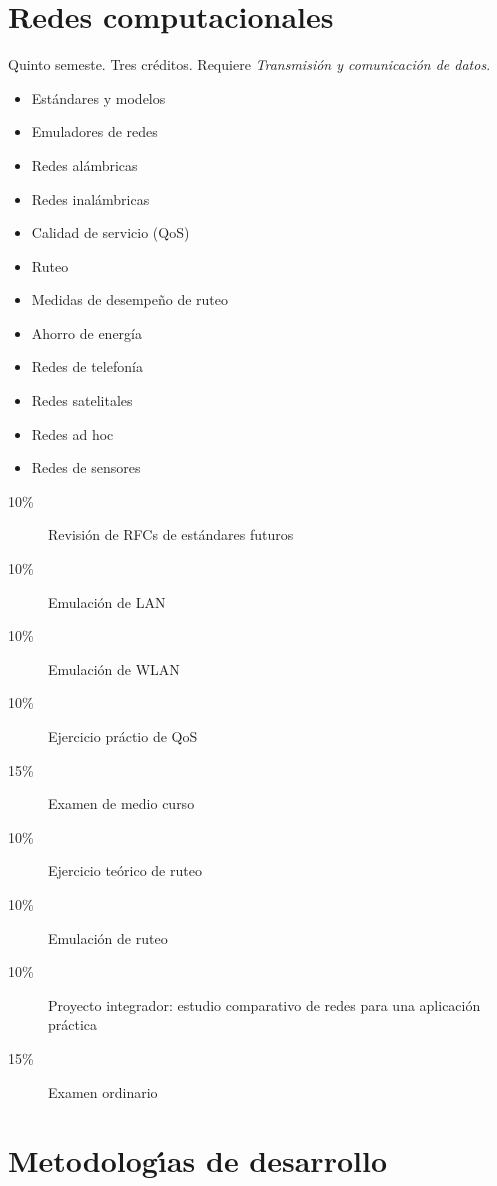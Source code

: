 \documentclass{article}
\begin{document}
\begin{multicols}{4}
\vfill\null \columnbreak

\hypertarget{rc}{\section*{Redes computacionales}}  

Quinto semeste. Tres cr\'{e}ditos. Requiere {\em Transmisi\'{o}n y
  comunicaci\'{o}n de datos}.

\begin{itemize}
\item{Est\'{a}ndares y modelos}
\item{Emuladores de redes}
\item{Redes al\'{a}mbricas}
\item{Redes inal\'{a}mbricas}
\item{Calidad de servicio (QoS)}
\item{Ruteo}
\item{Medidas de desempe\~{n}o de ruteo}  
\item{Ahorro de energ\'{i}a}
\item{Redes de telefon\'{i}a}
\item{Redes satelitales}
\item{Redes ad hoc}
\item{Redes de sensores}
\end{itemize}

\begin{description}
\item[10\%]{Revisi\'{o}n de RFCs de est\'{a}ndares futuros}
\item[10\%]{Emulaci\'{o}n de LAN}
\item[10\%]{Emulaci\'{o}n de WLAN}  
\item[10\%]{Ejercicio pr\'{a}ctio de QoS}
\item[15\%]{Examen de medio curso}
\item[10\%]{Ejercicio te\'{o}rico de ruteo}
\item[10\%]{Emulaci\'{o}n de ruteo}  
\item[10\%]{Proyecto integrador: estudio comparativo de redes para una
  aplicaci\'{o}n pr\'{a}ctica}
\item[15\%]{Examen ordinario}
\end{description}  

\vfill\null \columnbreak

\hypertarget{mdd}{\section*{Metodolog\'{\i}as de desarrollo}}


\end{multicols}
\end{document}
